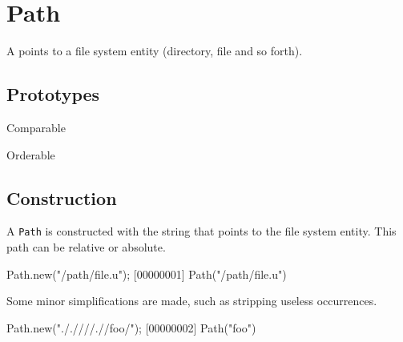 
\section{Path}

A  points to a file system entity (directory, file and so
forth).

\subsection{Prototypes}
\begin{refObjects}
\item[Comparable]
\item[Orderable]
\end{refObjects}

\subsection{Construction}

A \lstinline|Path| is constructed with the string that points to the
file system entity. This path can be relative or absolute.

\begin{urbiscript}[firstnumber=1]
Path.new("/path/file.u");
[00000001] Path("/path/file.u")
\end{urbiscript}

Some minor simplifications are made, such as stripping useless
 occurrences.

\begin{urbiscript}
Path.new("././///.//foo/");
[00000002] Path("foo")
\end{urbiscript}

